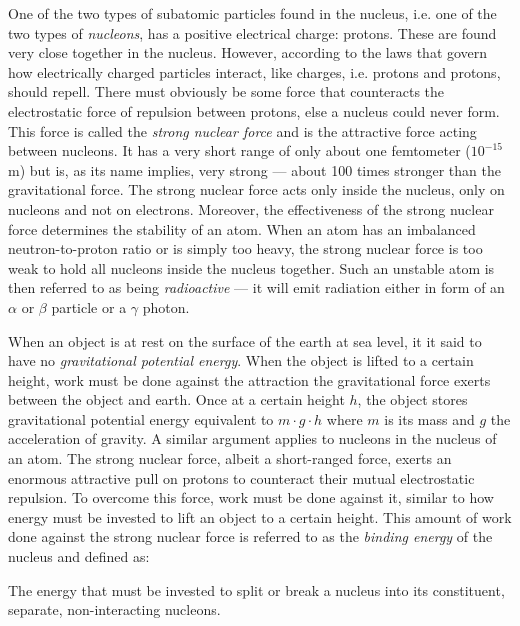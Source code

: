 One of the two types of subatomic particles found in the nucleus, i.e. one of the two types of \emph{nucleons}, has a positive electrical charge: protons. These are found very close together in the nucleus. However, according to the laws that govern how electrically charged particles interact, like charges, i.e. protons and protons, should repell. There must obviously be some force that counteracts the electrostatic force of repulsion between protons, else a nucleus could never form. This force is called the \emph{strong nuclear force} and is the attractive force acting between nucleons. It has a very short range of only about one femtometer ($10^{-15}$ m) but is, as its name implies, very strong --- about 100 times stronger than the gravitational force. The strong nuclear force acts only inside the nucleus, only on nucleons and not on electrons. Moreover, the effectiveness of the strong nuclear force determines the stability of an atom. When an atom has an imbalanced neutron-to-proton ratio or is simply too heavy, the strong nuclear force is too weak to hold all nucleons inside the nucleus together. Such an unstable atom is then referred to as being \emph{radioactive} --- it will emit radiation either in form of an $\alpha$ or $\beta$ particle or a $\gamma$ photon.


When an object is at rest on the surface of the earth at sea level, it it said to have no \emph{gravitational potential energy}. When the object is lifted to a certain height, work must be done against the attraction the gravitational force exerts between the object and earth. Once at a certain height $h$, the object stores gravitational potential energy equivalent to $m \cdot g \cdot h$ where $m$ is its mass and $g$ the acceleration of gravity. A similar argument applies to nucleons in the nucleus of an atom. The strong nuclear force, albeit a short-ranged force, exerts an enormous attractive pull on protons to counteract their mutual electrostatic repulsion. To overcome this force, work must be done against it, similar to how energy must be invested to lift an object to a certain height. This amount of work done against the strong nuclear force is referred to as the \emph{binding energy} of the nucleus and defined as:

\begin{displayquote}

	The energy that must be invested to split or break a nucleus into its constituent, separate, non-interacting nucleons.

\end{displayquote}

